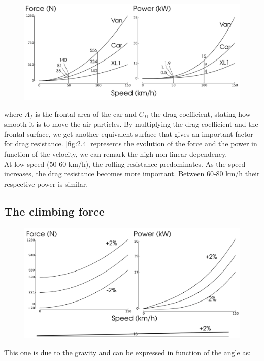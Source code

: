 	\begin{figure}
	\vspace{-5mm}
	\includegraphics[scale=0.3]{ch2/4}
	\label{fig:2.4}
	\end{figure}
	where $A_f$ is the frontal area of the car and $C_D$ the drag coefficient, stating how smooth it is to move the air particles. By multiplying the drag coefficient and the frontal surface, we get another equivalent surface that gives an important factor for drag resistance. \autoref{fig:2.4} represents the evolution of the force and the power in function of the velocity, we can remark the high non-linear dependency. \\
	
	At low speed (50-60 km/h), the rolling resistance predominates. As the speed increases, the drag resistance becomes more important. Between 60-80 km/h their respective power is similar. 
	
\subsection{The climbing force}
	\begin{figure}
	\vspace{-5mm}
	\includegraphics[scale=0.3]{ch2/5}
	\label{fig:2.5}
	\end{figure}
	This one is due to the gravity and can be expressed in function of the angle as: 

